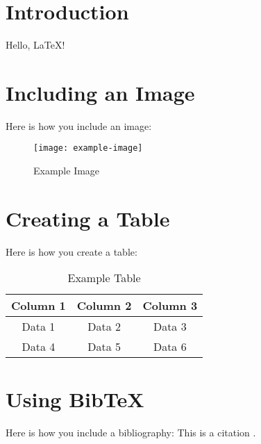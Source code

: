 \documentclass{article}
\begin{document}
\section{Introduction}
Hello, LaTeX!

\section{Including an Image}
Here is how you include an image:
\begin{figure}[h]
    \centering
    \texttt{[image: example-image]}
    \caption{Example Image}
    \label{fig:example}
\end{figure}

\section{Creating a Table}
Here is how you create a table:
\begin{table}[h]
    \caption{Example Table}
    \centering
    \begin{tabular}{|c|c|c|}
        \hline
        Column 1 & Column 2 & Column 3 \\
        \hline
        Data 1   & Data 2   & Data 3   \\
        Data 4   & Data 5   & Data 6   \\
        \hline
    \end{tabular}
    \label{tab:example}
\end{table}

\section{Using BibTeX}
Here is how you include a bibliography:
This is a citation \cite{example}.

\printbibliography
\end{document}
